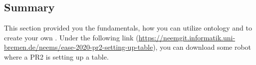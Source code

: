 \subsection{Summary}
	\label{ch:example}
	This section provided you the fundamentals, how you can utilize \soma ontology and \cram to create your own \neems. Under the following link (\url{https://neemgit.informatik.uni-bremen.de/neems/ease-2020-pr2-setting-up-table}), you can download some robot \neems where a PR2 is setting up a table.
									
%	
%	
